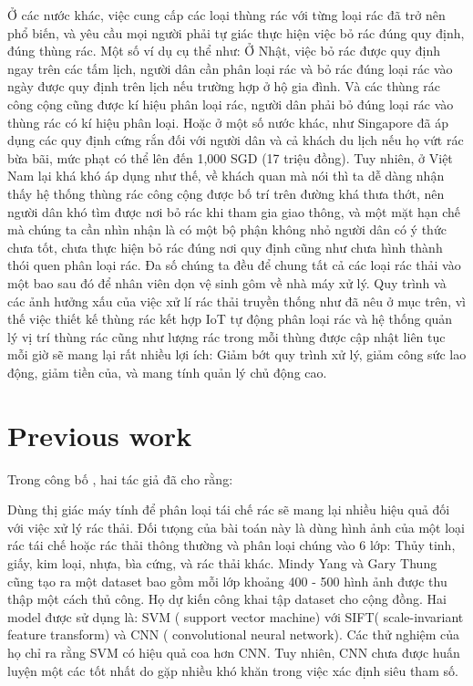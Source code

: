 Ở các nước khác, việc cung cấp các loại thùng rác với từng loại rác đã trở nên phổ biến, và yêu cầu mọi người phải tự giác thực hiện việc bỏ rác đúng quy định, đúng thùng rác. Một số ví dụ cụ thể như:
Ở Nhật, việc bỏ rác được quy định ngay trên các tấm lịch, người dân cần phân loại rác và bỏ rác đúng loại rác vào ngày được quy định trên lịch nếu trường hợp ở hộ gia đình. Và các thùng rác công cộng cũng được kí hiệu phân loại rác, người dân phải bỏ đúng loại rác vào thùng rác có kí hiệu phân loại. Hoặc ở một số nước khác, như Singapore đã áp dụng các quy định cứng rắn đối với người dân và cả khách du lịch nếu họ vứt rác bừa bãi, mức phạt có thể lên đến 1,000 SGD (17 triệu đồng). Tuy nhiên, ở Việt Nam lại khá khó áp dụng như thế, về khách quan mà nói thì ta dễ dàng nhận thấy hệ thống thùng rác công cộng được bố trí trên đường khá thưa thớt, nên người dân khó tìm được nơi bỏ rác khi tham gia giao thông, và một mặt hạn chế mà chúng ta cần nhìn nhận là có một bộ phận không nhỏ người dân có ý thức chưa tốt, chưa thực hiện bỏ rác đúng nơi quy định cũng như chưa hình thành thói quen phân loại rác. Đa số  chúng ta đều để chung tất cả các loại rác thải vào một bao sau đó để nhân viên dọn vệ sinh gôm về nhà máy xử lý. Quy trình và các ảnh hưởng xấu của việc xử lí rác thải truyền thống như đã nêu ở mục trên, vì thế việc thiết kế thùng rác kết hợp IoT tự động phân loại rác và hệ thống quản lý vị trí thùng rác cũng như lượng rác trong mỗi thùng được cập nhật liên tục mỗi giờ sẽ mang lại rất nhiều lợi ích: Giảm bớt quy trình xử lý, giảm công sức lao động, giảm tiền của, và mang tính quản lý chủ động cao.



\section{Previous work}

Trong công bố  \cite{trashnet}, hai tác giả đã cho rằng:

Dùng thị giác máy tính để phân loại tái chế rác sẽ mang lại nhiều hiệu quả đối với việc xử lý rác thải. Đối tưọng của bài toán này là dùng hình ảnh của một loại rác tái chế hoặc rác thải thông thường và phân loại chúng vào 6 lớp: Thủy tinh, giấy, kim loại, nhựa, bìa cứng, và rác thải khác. Mindy Yang và Gary Thung cũng tạo ra một dataset bao gồm mỗi lớp khoảng 400 - 500 hình ảnh được thu thập một cách thủ công. Họ dự kiến công khai tập dataset cho cộng đồng. Hai model được sử dụng là: SVM ( support vector machine) với SIFT( scale-invariant feature transform) và CNN ( convolutional neural network). Các thử nghiệm của họ chỉ ra rằng SVM có hiệu quả coa hơn CNN. Tuy nhiên, CNN chưa được huấn luyện một các tốt nhất do gặp nhiều khó khăn trong việc xác định siêu tham số.

